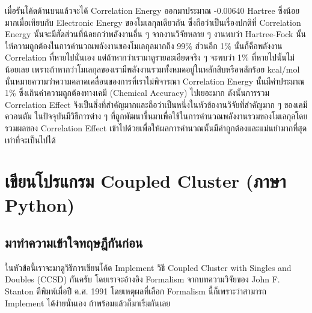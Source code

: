 \noindent เมื่อรันโค้ดด้านบนแล้วจะได้ Correlation Energy ออกมาประมาณ -0.00640 Hartree ซึ่งน้อยมากเมื่อเทียบกับ Electronic Energy ของโมเลกุลเดียวกัน ซึ่งถือว่าเป็นเรื่องปกติที่ Correlation Energy นั้นจะมีสัดส่วนที่น้อยกว่าพลังงานอื่น ๆ จากงานวิจัยหลาย ๆ งานพบว่า Hartree-Fock นั้นให้ความถูกต้องในการคำนวณพลังงานของโมเลกุลมากถึง 99\% ส่วนอีก 1\% นั้นก็คือพลังงาน Correlation ที่หายไปนั่นเอง แต่ถ้าหากว่าเรามาดูรายละเอียดจริง ๆ จะพบว่า 1\% ที่หายไปนั้นไม่น้อยเลย เพราะถ้าหากว่าโมเลกุลของเรามีพลังงานรวมทั้งหมดอยู่ในหลักสิบหรือหลักร้อย kcal/mol นั่นหมายความว่าความคลาดเคลื่อนของการที่เราไม่พิจารณา Correlation Energy นั้นมีค่าประมาณ 1\% ซึ่งเกินค่าความถูกต้องทางเคมี (Chemical Accuracy) ไปเยอะมาก ดังนั้นการรวม Correlation Effect จึงเป็นสิ่งที่สำคัญมากและถือว่าเป็นหนึ่งในหัวข้องานวิจัยที่สำคัญมาก ๆ ของเคมีควอนตัม ในปัจจุบันมีวิธีการต่าง ๆ ที่ถูกพัฒนาขึ้นมาเพื่อใช้ในการคำนวณพลังงานรวมของโมเลกุลโดยรวมผลของ Correlation Effect เข้าไปด้วยเพื่อให้ผลการคำนวณนั้นมีค่าถูกต้องและแม่นยำมากที่สุดเท่าที่จะเป็นไปได้

\section{เขียนโปรแกรม Coupled Cluster (ภาษา Python)}

\subsection{มาทำความเข้าใจทฤษฎีกันก่อน}

ในหัวข้อนี้เราจะมาดูวิธีการเขียนโค้ด Implement วิธี Coupled Cluster with Singles and Doubles (CCSD) กันครับ โดยเราจะอ้างอิง Formalism จากบทความวิจัยของ John F. Stanton ตีพิมพ์เมื่อปี ค.ศ. 1991\autocite{stanton1991} โดยเหตุผลที่เลือก Formalism นี้ก็เพราะว่าสามารถ Implement ได้ง่ายนั่นเอง ถ้าพร้อมแล้วก็มาเริ่มกันเลย

